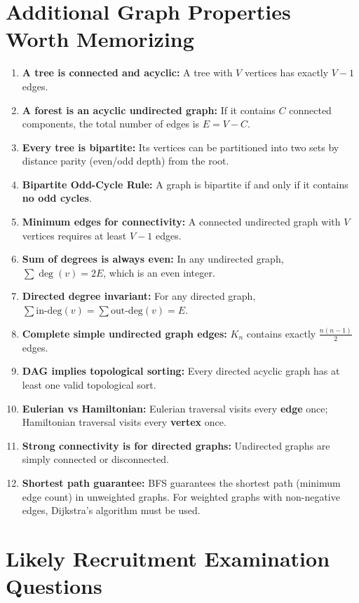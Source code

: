 \section{Additional Graph Properties Worth Memorizing}

\begin{enumerate}
    \item \textbf{A tree is connected and acyclic:} A tree with $V$ vertices has exactly $V - 1$ edges.
    \item \textbf{A forest is an acyclic undirected graph:} If it contains $C$ connected components, the total number of edges is $E = V - C$.
    \item \textbf{Every tree is bipartite:} Its vertices can be partitioned into two sets by distance parity (even/odd depth) from the root.
    \item \textbf{Bipartite Odd-Cycle Rule:} A graph is bipartite if and only if it contains \textbf{no odd cycles}.
    \item \textbf{Minimum edges for connectivity:} A connected undirected graph with $V$ vertices requires at least $V - 1$ edges.
    \item \textbf{Sum of degrees is always even:} In any undirected graph, $\sum \deg(v) = 2E$, which is an even integer.
    \item \textbf{Directed degree invariant:} For any directed graph, $\sum \text{in-deg}(v) = \sum \text{out-deg}(v) = E$.
    \item \textbf{Complete simple undirected graph edges:} $K_n$ contains exactly $\frac{n(n-1)}{2}$ edges.
    \item \textbf{DAG implies topological sorting:} Every directed acyclic graph has at least one valid topological sort.
    \item \textbf{Eulerian vs Hamiltonian:} Eulerian traversal visits every \textbf{edge} once; Hamiltonian traversal visits every \textbf{vertex} once.
    \item \textbf{Strong connectivity is for directed graphs:} Undirected graphs are simply connected or disconnected.
    \item \textbf{Shortest path guarantee:} BFS guarantees the shortest path (minimum edge count) in unweighted graphs. For weighted graphs with non-negative edges, Dijkstra's algorithm must be used.
\end{enumerate}

\section{Likely Recruitment Examination Questions}

